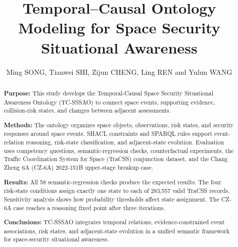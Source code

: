\documentclass[Royal,sageh,times]{sagej}
\begin{document}
\title{Temporal--Causal Ontology Modeling for Space Security Situational Awareness}
\author{Ming SONG, Tianwei SHI, Zijun CHENG, Ling REN and Yulun WANG}
\begin{abstract}
\textbf{Purpose:} This study develops the Temporal-Causal Space Security Situational Awareness Ontology (TC-SSSAO) to connect space events, supporting evidence, collision-risk states, and changes between adjacent assessments.

\textbf{Methods:} The ontology organizes space objects, observations, risk states, and security responses around space events. SHACL constraints and SPARQL rules support event-relation reasoning, risk-state classification, and adjacent-state evolution. Evaluation uses competency questions, semantic-regression checks, counterfactual experiments, the Traffic Coordination System for Space (TraCSS) conjunction dataset, and the Chang Zheng 6A (CZ-6A) 2022-151B upper-stage breakup case.

\textbf{Results:} All 58 semantic-regression checks produce the expected results. The four risk-state conditions assign exactly one state to each of 283,557 valid TraCSS records. Sensitivity analysis shows how probability thresholds affect state assignment. The CZ-6A case reaches a reasoning fixed point after three iterations.

\textbf{Conclusions:} TC-SSSAO integrates temporal relations, evidence-constrained event associations, risk states, and adjacent-state evolution in a unified semantic framework for space-security situational awareness.
\end{abstract}
\maketitle
\end{document}
